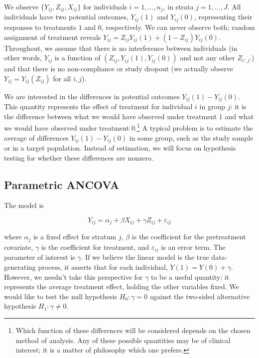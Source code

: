 \documentclass[11pt]{article}
\newcommand{\eps}{\varepsilon}
\begin{document}
We observe $\{Y_{ij}, Z_{ij}, X_{ij}\}$ for individuals $i = 1, \dots, n_j$, in strata $j = 1, \dots, J$.
All individuals have two potential outcomes, $Y_{ij}(1)$ and $Y_{ij}(0)$, representing their responses to treatments $1$ and $0$, respectively.
We can never observe both; random assignment of treatment reveals $Y_{ij} = Z_{ij}Y_{ij}(1) + (1-Z_{ij})Y_{ij}(0)$.
Throughout, we assume that there is no interference between individuals 
(in other words, $Y_{ij}$ is a function of $(Z_{ij}, Y_{ij}(1), Y_{ij}(0))$ and not any other $Z_{i', j'}$)
and that there is no non-compliance or study dropout 
(we actually observe $Y_{ij} = Y_{ij}(Z_{ij})$ for all $i, j$).

We are interested in the differences in potential outcomes $Y_{ij}(1) - Y_{ij}(0)$.
This quantity represents the effect of treatment for individual $i$ in group $j$: 
it is the difference between what we would have observed under treatment 1 and what we would have observed under treatment $0$.\footnote{
Which function of these differences will be considered depends on the chosen method of analysis.
Any of these possible quantities may be of clinical interest; it is a matter of philosophy which one prefers.}
A typical problem is to estimate the average of differences $Y_{ij}(1) - Y_{ij}(0)$ in some group, such as the study sample or in a target population.
Instead of estimation, we will focus on hypothesis testing for whether these differences are nonzero.

\subsection*{Parametric ANCOVA}

The model is

\begin{equation}\label{eqn:ancova}
Y_{ij} = \alpha_j + \beta X_{ij} + \gamma Z_{ij} + \eps_{ij}
\end{equation}

\noindent where $\alpha_j$ is a fixed effect for stratum $j$, $\beta$ is the coefficient for the pretreatment covariate,
$\gamma$ is the coefficient for treatment,
and $\eps_{ij}$ is an error term.
The parameter of interest is $\gamma$. 
If we believe the linear model is the true data-generating process, it asserts that for each individual, $Y(1) = Y(0) + \gamma$.
However, we needn't take this perspective for $\gamma$ to be a useful quantity; it represents the average treatment effect, holding the other variables fixed.
We would like to test the null hypothesis $H_0: \gamma = 0$ against
the two-sided alternative hypothesis $H_1: \gamma \neq 0$.
\end{document}
